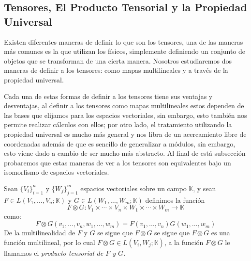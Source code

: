 \subsection{Tensores, El Producto Tensorial y la Propiedad Universal}\label{Subsección: Tensores y El Producto Tensorial}

Existen diferentes maneras de definir lo que son los tensores, una de las maneras más comunes es la que utilizan los físicos, simplemente definiendo un conjunto de objetos que se transforman de una cierta manera. Nosotros estudiaremos dos maneras de definir a los tensores: como mapas multilineales y a través de la propiedad universal.

Cada una de estas formas de definir a los tensores tiene sus ventajas y desventajas, al definir a los tensores como mapas multilineales estos dependen de las bases que elijamos para los espacios vectoriales, sin embargo, esto también nos permite realizar cálculos con ellos; por otro lado, el tratamiento utilizando la propiedad universal es mucho más general y nos libra de un acercamiento libre de coordenadas además de que es sencillo de generalizar a módulos, sin embargo, esto viene dado a cambio de ser mucho más abstracto. Al final de está subsección probaremos que estas maneras de ver a los tensores son equivalentes bajo un isomorfismo de espacios vectoriales.

\begin{definition}
	Sean $\{V_i\}_{i=1}^{n}$ y $\{W_j\}_{j=1}^{m}$ espacios vectoriales sobre un campo $\mathbb{K}$, y sean $F \in L(V_1, \ldots, V_n; \mathbb{K})$ y $G \in L(W_1, \ldots, W_m; \mathbb{K})$ definimos la función
	\[
		F \otimes G : V_1 \times \cdots \times V_n \times W_1 \times \cdots \times W_m \to \mathbb{K}
	\]
	como:
	\[
		F \otimes G (v_1, \ldots, v_n, w_1, \ldots, w_m)
		=
		F(v_1, \ldots, v_n)G(w_1, \ldots, w_m)
	\]
	De la multilinealidad de $F$ y $G$ se sigue que $F \otimes G$ se sigue que $F \otimes G$ es una función multilineal, por lo cual $F \otimes G \in L(V_i,W_j; \mathbb{K})$, a la función $F \otimes G$ le llamamos el \it{producto tensorial de $F$ y $G$}.
\end{definition}

